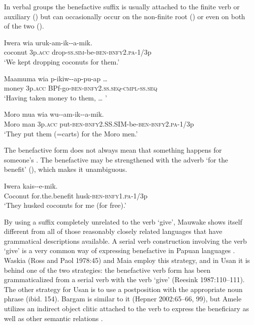 In verbal groups the benefactive suffix is usually attached to the finite verb or auxiliary () but can occasionally occur on the non-finite root () or even on both of the two ().

\ea%
\label{ex:x212}
\gll Iwera wia uruk-am-ik--a-mik. \\
coconut 3p.\textsc{acc} drop-\textsc{ss}.\textsc{sim}-be-\textsc{ben}-\textsc{bnfy}2.\textsc{pa}-1/3p\\
\glt`We kept dropping coconuts for them.' 
\z

\ea%
\label{ex:x213}
\gll Maamuma wia p-ikiw--ap-pu-ap {\dots} \\
money 3p.\textsc{acc} BPf-go-\textsc{ben}-\textsc{bnfy}2.\textsc{ss}.\textsc{seq}-\textsc{cmpl}-\textsc{ss}.\textsc{seq} \\
\glt`Having taken money to them, {\dots} '
\z

\ea%
\label{ex:x214}
\gll Moro mua wia wu--am-ik--a-mik. \\
Moro man 3p.\textsc{acc} put-\textsc{ben}-\textsc{bnfy}2.SS.SIM-be-\textsc{ben}-\textsc{bnfy}2.\textsc{pa}-1/3p\\
\glt`They put them (=carts) for the Moro men.' 
\z

The benefactive form does not always mean that something happens for someone's\textstyleEmphasizedWords{} . The benefactive may be strengthened with the adverb  `for the benefit' (), which makes it unambiguous.

\ea%
\label{ex:x215}
\gll Iwera  kais--e-mik. \\
Coconut for.the.benefit husk-\textsc{ben}-\textsc{bnfy}1.\textsc{pa}-1/3p \\
\glt`They husked coconuts for me (for free).'
\z

By using a suffix completely unrelated to the verb `give', Mauwake shows itself different from all of those reasonably closely related languages that have grammatical descriptions available. A serial verb construction involving the verb `give' is a very common way of expressing benefactive in Papuan languages \citep[141]{Foley1986}. Waskia ({Ross and Paol 1978}:45) and Maia \citep[125]{Hardin2002} employ this strategy, and in Usan it is behind one of the two strategies: the benefactive verb form has been grammaticalized from a serial verb with the verb `give' ({Reesink 1987}:110--111). The other strategy for Usan is to use a postposition with the appropriate noun phrase (ibid. 154). Bargam is similar to it ({Hepner 2002}:65--66, 99), but Amele utilizes an indirect object clitic attached to the verb to express the beneficiary as well as other semantic relations \citep[167]{Roberts1987}. 

